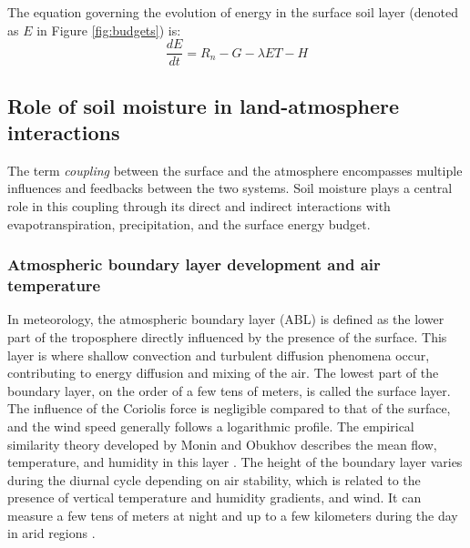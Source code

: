 The equation governing the evolution of energy in the surface soil layer (denoted as $E$ in Figure \ref{fig:budgets}) is:
\begin{equation}
    \frac{dE}{dt} = R_{n} - G - \lambda ET - H
\end{equation}

\subsection{Role of soil moisture in land-atmosphere interactions}

The term \textit{coupling} between the surface and the atmosphere encompasses multiple influences and feedbacks between the two systems. Soil moisture plays a central role in this coupling through its direct and indirect interactions with evapotranspiration, precipitation, and the surface energy budget.

\subsubsection*{Atmospheric boundary layer development and air temperature}

In meteorology, the atmospheric boundary layer (ABL) is defined as the lower part of the troposphere directly influenced by the presence of the surface. This layer is where shallow convection and turbulent diffusion phenomena occur, contributing to energy diffusion and mixing of the air.
The lowest part of the boundary layer, on the order of a few tens of meters, is called the surface layer. The influence of the Coriolis force is negligible compared to that of the surface, and the wind speed generally follows a logarithmic profile. The empirical similarity theory developed by Monin and Obukhov describes the mean flow, temperature, and humidity in this layer \citep{monin1954osnovnye}.
The height of the boundary layer varies during the diurnal cycle depending on air stability, which is related to the presence of vertical temperature and humidity gradients, and wind. It can measure a few tens of meters at night and up to a few kilometers during the day in arid regions \citep{garratt_review_1994}.

